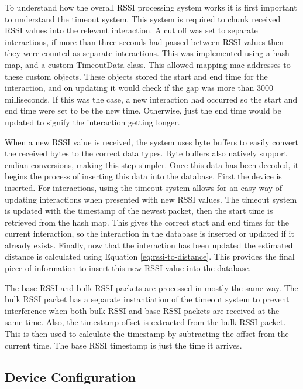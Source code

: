 \documentclass{l4proj}
\begin{document}
To understand how the overall RSSI processing system works it is first important to understand the timeout system. This system is required to chunk received RSSI values into the relevant interaction. A cut off was set to separate interactions, if more than three seconds had passed between RSSI values then they were counted as separate interactions. This was implemented using a hash map, and a custom TimeoutData class. This allowed mapping mac addresses to these custom objects. These objects stored the start and end time for the interaction, and on updating it would check if the gap was more than 3000 milliseconds. If this was the case, a new interaction had occurred so the start and end time were set to be the new time. Otherwise, just the end time would be updated to signify the interaction getting longer.

When a new RSSI value is received, the system uses byte buffers to easily convert the received bytes to the correct data types. Byte buffers also natively support endian conversions, making this step simpler. Once this data has been decoded, it begins the process of inserting this data into the database. First the device is inserted. For interactions, using the timeout system allows for an easy way of updating interactions when presented with new RSSI values. The timeout system is updated with the timestamp of the newest packet, then the start time is retrieved from the hash map. This gives the correct start and end times for the current interaction, so the interaction in the database is inserted or updated if it already exists. Finally, now that the interaction has been updated the estimated distance is calculated using Equation \ref{eq:rssi-to-distance}. This provides the final piece of information to insert this new RSSI value into the database.

The base RSSI and bulk RSSI packets are processed in mostly the same way. The bulk RSSI packet has a separate instantiation of the timeout system to prevent interference when both bulk RSSI and base RSSI packets are received at the same time. Also, the timestamp offset is extracted from the bulk RSSI packet. This is then used to calculate the timestamp by subtracting the offset from the current time. The base RSSI timestamp is just the time it arrives.

\subsection{Device Configuration}
\end{document}
